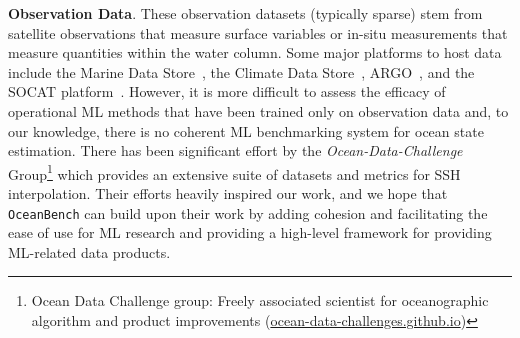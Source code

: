 \textbf{Observation Data}. 
These observation datasets (typically sparse) stem from satellite observations that measure surface variables or in-situ measurements that measure quantities within the water column. 
Some major platforms to host data include the Marine Data Store~\citep{MDSALONGTRACK,MDSINSITU}, the Climate Data Store~\citep{CDSOBSSST,CDSOBSSSTENS,CDSOBSOC}, ARGO~\citep{ARGO}, and the SOCAT platform~\citep{SOCAT}.
However, it is more difficult to assess the efficacy of operational ML methods that have been trained only on observation data and, to our knowledge, there is no coherent ML benchmarking system for ocean state estimation.
There has been significant effort by the \textit{Ocean-Data-Challenge} Group\footnote{Ocean Data Challenge group: Freely associated scientist for oceanographic algorithm and product improvements (\href{https://ocean-data-challenges.github.io/}{ocean-data-challenges.github.io})} which provides an extensive suite of datasets and metrics for SSH interpolation.
Their efforts heavily inspired our work, and we hope that \texttt{OceanBench} can build upon their work by adding cohesion and facilitating the ease of use for ML research and providing a high-level framework for providing ML-related data products.



